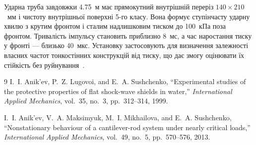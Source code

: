 Ударна труба завдовжки 4.75~м має прямокутний внутрішній переріз $140\times210$~мм і чистоту внутрішньої поверхні 5-го класу. Вона формує ступінчасту ударну хвилю з крутим фронтом і сталим надлишковим тиском до 100~кПа поза фронтом. Тривалість імпульсу становить приблизно 8~мс, а час наростання тиску у фронті --- близько 40~мкс. Установку застосовують для визначення залежності власних частот тонкостінних конструкцій від тиску, що дає змогу оцінювати їх стійкість без руйнування~\cite{equipment:anikiev2013}.

\begin{center}
\end{center}

\renewcommand{\refname}{Література}
\begin{thebibliography}{9}
I.~I. Anik'ev, P.~Z. Lugovoi, and E.~A. Sushchenko,
``Experimental studies of the protective properties of flat shock-wave shields in water,''
\emph{International Applied Mechanics}, vol.~35, no.~3, pp.~312--314, 1999.

I.~I. Anik'ev, V.~A. Maksimyuk, M.~I. Mikhailova, and E.~A. Sushchenko,
``Nonstationary behaviour of a cantilever-rod system under nearly critical loads,''
\emph{International Applied Mechanics}, vol.~49, no.~5, pp.~570--576, 2013.
\end{thebibliography}
